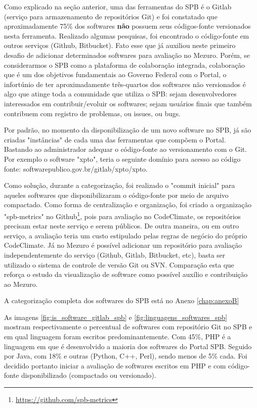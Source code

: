 Como explicado na seção anterior, uma das ferramentas do SPB é o Gitlab
(serviço para armazenamento de repositórios Git) e foi constatado que
aproximadamente 75\% dos softwares \textbf{não} possuem seus códigos-fonte
versionados nesta ferramenta. Realizado algumas pesquisas, foi encontrado o
código-fonte em outros serviços (Github, Bitbucket). Fato esse que já auxiliou
neste primeiro desafio de adicionar determinados softwares para avaliação no
Mezuro. Porém, se considerarmos o SPB como a plataforma de colaboração
integrada, colaboração que é um dos objetivos fundamentais ao Governo Federal
com o Portal, o infortúnio de ter aproximadamente três-quartos dos softwares
não versionados é algo que atinge toda a comunidade que utiliza o SPB: sejam
desenvolvedores interessados em contribuir/evoluir os softwares; sejam usuários
finais que também contribuem com registro de problemas, ou issues, ou bugs.

Por padrão, no momento da disponibilização de um novo software no SPB, já são
criadas "instâncias" de cada uma das ferramentas que compõem o Portal. Bastando
ao administrador adequar o código-fonte ao versionamento com o Git. Por exemplo
o software "xpto", teria o seguinte domínio para acesso ao código fonte:
softwarepublico.gov.br/gitlab/xpto/xpto.

Como solução, durante a categorização, foi realizado o "commit inicial" para
aqueles softwares que disponibilizaram o código-fonte por meio de arquivo
compactado. Como forma de centralização e organização, foi criado a organização
"spb-metrics" no Github\footnote{\url{https://github.com/spb-metrics}}, pois
para avaliação no CodeClimate, os repositórios precisam estar neste serviço e
serem públicos. De outra maneira, ou em outro serviço, a avaliação teria um
custo estipulado pelas regras de negócio do próprio CodeClimate. Já no Mezuro é
possível adicionar um repositório para avaliação independentemente do serviço
(Github, Gitlab, Bitbucket, etc), basta ser utilizado o sistema de controle de
versão Git ou SVN. Comparação esta que reforça o estudo da visualização de
software como possível auxílio e contribuição ao Mezuro.

A categorização completa dos softwares do SPB está no Anexo \ref{chap:anexoB}

As imagens \ref{fig:is_software_gitlab_spb} e \ref{fig:linguagens_softwares_spb}
mostram respectivamente o percentual de softwares com repositório Git no SPB e
em qual linguagem foram escritos predominantemente. Com 45\%, PHP é a linguagem
em que é desenvolvido a maioria dos softwares do Portal SPB. Seguido por Java,
com 18\% e outras (Python, C++, Perl), sendo menos de 5\% cada. Foi decidido
portanto iniciar a avaliação de softwares escritos em PHP e com código-fonte
disponibilizado (compactado ou versionado).


